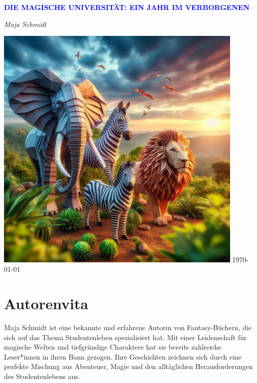 \documentclass[12pt]{article}
\begin{document}
\begin{titlepage}
    \centering
    \vspace*{3cm}
    {\Huge\bfseries\textcolor{blue}{\MakeUppercase{ Die Magische Universität: Ein Jahr im Verborgenen }}\par}
    \vspace{0.5cm}
    {\Large\textit{ Maja Schmidt }\par}
    \vfill
    \includegraphics[width=0.9\textwidth]{ cover.jpg }
    \vfill
    \today
\end{titlepage}

\section*{Autorenvita}
\vspace{4cm}
Maja Schmidt ist eine bekannte und erfahrene Autorin von Fantasy-Büchern, die sich auf das Thema Studentenleben spezialisiert hat. Mit einer Leidenschaft für magische Welten und tiefgründige Charaktere hat sie bereits zahlreiche Leser*innen in ihren Bann gezogen. Ihre Geschichten zeichnen sich durch eine perfekte Mischung aus Abenteuer, Magie und den alltäglichen Herausforderungen des Studentenlebens aus.

\clearpage
\tableofcontents
\clearpage
\end{document}
